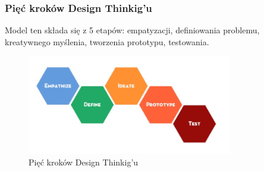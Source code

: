 \documentclass[a4paper,titleauthor]{mwart}
\begin{document}
	\subsubsection{Pięć kroków Design Thinkig'u}
	Model ten składa się z 5 etapów: empatyzacji, definiowania problemu, kreatywnego myślenia, tworzenia prototypu, testowania.
	\begin{figure}[h]
		\centering
		\includegraphics[width=0.8\textwidth]{5krokow.PNG}
		\caption{Pięć kroków Design Thinkig'u}
	\end{figure}
\end{document}

